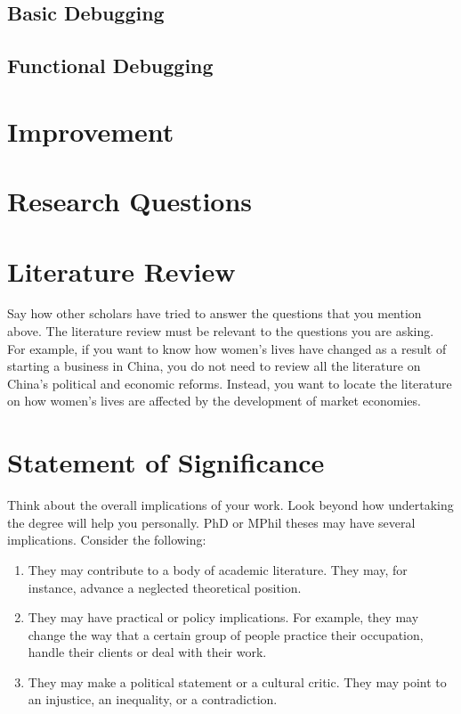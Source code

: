 \documentclass[draftclsnofoot,journal,onecolumn,12pt]{IEEEtran}
\begin{document}
\subsection{Basic Debugging}

\subsection{Functional Debugging}

\section{Improvement}

\section{Research Questions}

\section{Literature Review}
Say how other scholars have tried to answer the questions that you mention above. The literature review must be
relevant to the questions you are asking. For example, if you want to know how women's lives have changed as
a result of starting a business in China, you do not need to review all the literature on China's political and
economic reforms. Instead, you want to locate the literature on how women's lives are affected by the
development of market economies.

\section{Statement of Significance}
Think about the overall implications of your work. Look beyond how undertaking the degree will help you
personally. PhD or MPhil theses may have several implications. Consider the following:
\begin{enumerate}
  \item They may contribute to a body of academic literature. They may, for instance, advance a neglected theoretical
position.
  \item They may have practical or policy implications. For example, they may change the way that a certain group
of people practice their occupation, handle their clients or deal with their work.
  \item They may make a political statement or a cultural critic. They may point to an injustice, an inequality, or a
contradiction.
\end{enumerate}
\end{document}
